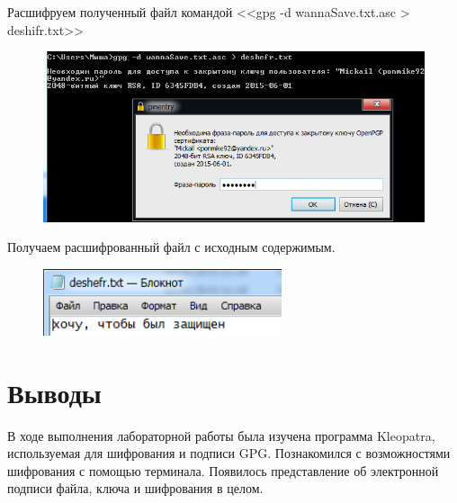 \documentclass[utf8x, 12pt]{G7-32}
\begin{document}
Расшифруем полученный файл командой <<gpg -d wannaSave.txt.asc > deshifr.txt>>

\begin{figure}[hhh!]
	\begin{center}
		\includegraphics[width=12cm]{img/8_7}
	\end{center}
\end{figure}	

Получаем расшифрованный файл с исходным содержимым.

\begin{figure}[hhh!]
	\begin{center}
		\includegraphics[width=7cm]{img/8_8}
	\end{center}
\end{figure}	


\chapter{Выводы}

В ходе выполнения лабораторной работы была изучена программа Kleopatra, используемая для шифрования и подписи GPG. Познакомился с возможностями шифрования с помощью терминала. Появилось представление об электронной подписи файла, ключа и шифрования в целом.
\end{document}
